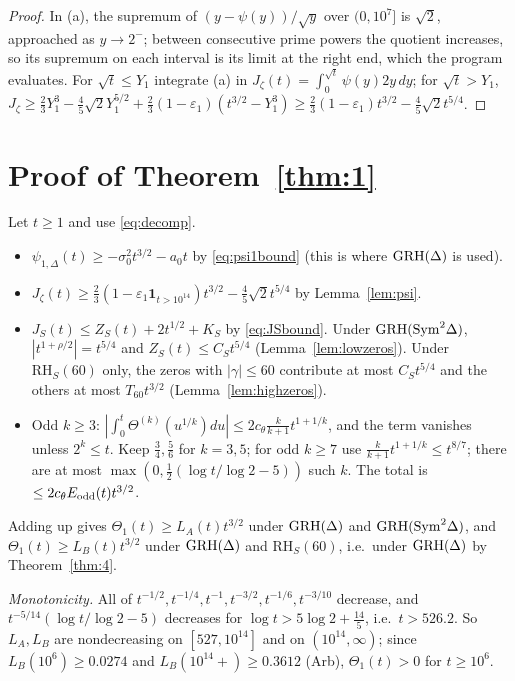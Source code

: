 \begin{proof}
In (a), the supremum of $(y-\psi(y))/\sqrt y$ over $(0,10^7]$ is $\sqrt2$, approached as $y\to2^-$; between consecutive prime powers the quotient increases, so its supremum on each interval is its limit at the right end, which the program evaluates. For $\sqrt t\le Y_1$ integrate (a) in $J_\zeta(t)=\int_0^{\sqrt t}\psi(y)2y\,dy$; for $\sqrt t>Y_1$, $J_\zeta\ge\frac23Y_1^3-\frac45\sqrt2Y_1^{5/2}+\frac23(1-\varepsilon_1)(t^{3/2}-Y_1^3)\ge\frac23(1-\varepsilon_1)t^{3/2}-\frac45\sqrt2t^{5/4}$.
\end{proof}

\section{Proof of Theorem~\ref{thm:1}}\label{sec:proof1}

Let $t\ge1$ and use \eqref{eq:decomp}.
\begin{itemize}
\item $\psi_{1,\Delta}(t)\ge-\sigma_0^2t^{3/2}-a_0t$ by \eqref{eq:psi1bound} (this is where $\mathrm{GRH}(\Delta)$ is used).
\item $J_\zeta(t)\ge\frac23(1-\varepsilon_1\mathbf 1_{t>10^{14}})t^{3/2}-\frac45\sqrt2t^{5/4}$ by Lemma~\ref{lem:psi}.
\item $J_S(t)\le Z_S(t)+2t^{1/2}+K_S$ by \eqref{eq:JSbound}. Under $\mathrm{GRH}(\mathrm{Sym}^2\Delta)$, $|t^{1+\rho/2}|=t^{5/4}$ and $Z_S(t)\le C_St^{5/4}$ (Lemma~\ref{lem:lowzeros}). Under $\mathrm{RH}_S(60)$ only, the zeros with $|\gamma|\le60$ contribute at most $C_St^{5/4}$ and the others at most $T_{60}t^{3/2}$ (Lemma~\ref{lem:highzeros}).
\item Odd $k\ge3$: $|\int_0^t\Theta^{(k)}(u^{1/k})du|\le2c_\theta\frac k{k+1}t^{1+1/k}$, and the term vanishes unless $2^k\le t$. Keep $\frac34,\frac56$ for $k=3,5$; for odd $k\ge7$ use $\frac k{k+1}t^{1+1/k}\le t^{8/7}$; there are at most $\max(0,\frac12(\log t/\log2-5))$ such $k$. The total is $\le2c_\theta E_{\rm odd}(t)t^{3/2}$.
\end{itemize}
Adding up gives $\Theta_1(t)\ge L_A(t)t^{3/2}$ under $\mathrm{GRH}(\Delta)$ and $\mathrm{GRH}(\mathrm{Sym}^2\Delta)$, and $\Theta_1(t)\ge L_B(t)t^{3/2}$ under $\mathrm{GRH}(\Delta)$ and $\mathrm{RH}_S(60)$, i.e.\ under $\mathrm{GRH}(\Delta)$ by Theorem~\ref{thm:4}.

\emph{Monotonicity.} All of $t^{-1/2},t^{-1/4},t^{-1},t^{-3/2},t^{-1/6},t^{-3/10}$ decrease, and $t^{-5/14}(\log t/\log2-5)$ decreases for $\log t>5\log2+\frac{14}5$, i.e.\ $t>526.2$. So $L_A,L_B$ are nondecreasing on $[527,10^{14}]$ and on $(10^{14},\infty)$; since $L_B(10^6)\ge0.0274$ and $L_B(10^{14}+)\ge0.3612$ (Arb), $\Theta_1(t)>0$ for $t\ge10^6$.

